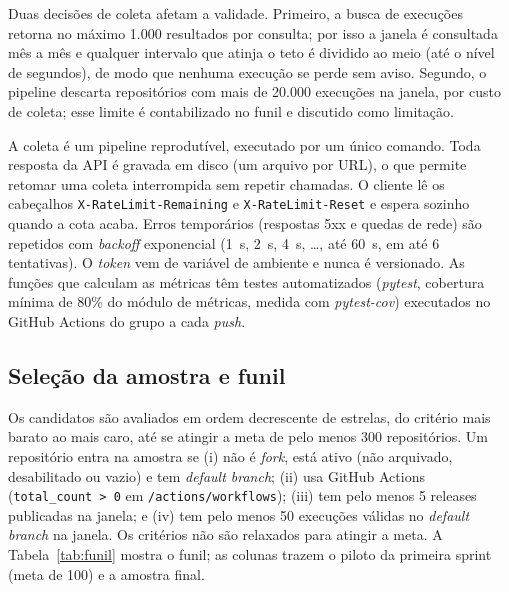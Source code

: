 Duas decisões de coleta afetam a validade. Primeiro, a busca de execuções
retorna no máximo 1.000 resultados por consulta; por isso a janela é consultada
mês a mês e qualquer intervalo que atinja o teto é dividido ao meio (até o
nível de segundos), de modo que nenhuma execução se perde sem aviso. Segundo, o
pipeline descarta repositórios com mais de 20.000 execuções na janela, por custo
de coleta; esse limite é contabilizado no funil e discutido como limitação.

A coleta é um pipeline reprodutível, executado por um único comando. Toda
resposta da API é gravada em disco (um arquivo por URL), o que permite retomar
uma coleta interrompida sem repetir chamadas. O cliente lê os cabeçalhos
\texttt{X-RateLimit-Remaining} e \texttt{X-RateLimit-Reset} e espera
sozinho quando a cota acaba. Erros temporários (respostas 5xx e quedas de rede)
são repetidos com \textit{backoff} exponencial (1~s, 2~s, 4~s, \ldots, até 60~s,
em até 6 tentativas). O \textit{token} vem de variável de ambiente e nunca é
versionado. As funções que calculam as métricas têm testes automatizados
(\textit{pytest}, cobertura mínima de 80\% do módulo de métricas, medida com
\textit{pytest-cov}) executados no GitHub Actions do grupo a cada \textit{push}.

\subsection{Seleção da amostra e funil}
\label{sec:funil}

Os candidatos são avaliados em ordem decrescente de estrelas, do critério mais
barato ao mais caro, até se atingir a meta de pelo menos 300 repositórios. Um
repositório entra na amostra se (i) não é \textit{fork}, está ativo (não
arquivado, desabilitado ou vazio) e tem \textit{default branch}; (ii) usa GitHub
Actions (\texttt{total\_count > 0} em \texttt{/actions/workflows}); (iii) tem
pelo menos 5 releases publicadas na janela; e (iv) tem pelo menos 50 execuções
válidas no \textit{default branch} na janela. Os critérios não são relaxados para
atingir a meta. A Tabela~\ref{tab:funil} mostra o funil; as colunas trazem o
piloto da primeira sprint (meta de 100) e a amostra final.

